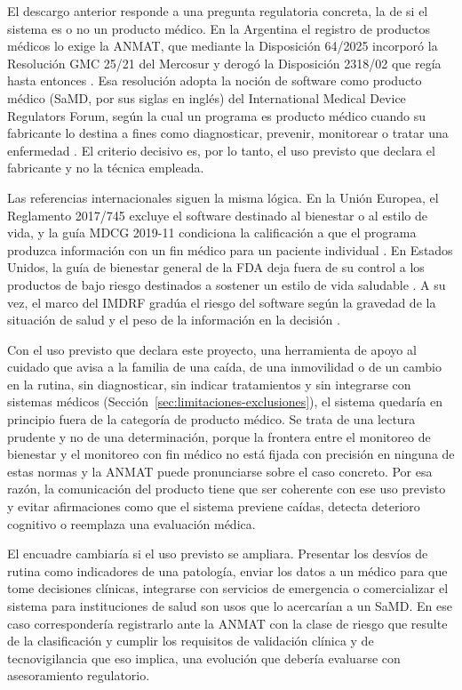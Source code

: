 El descargo anterior responde a una pregunta regulatoria concreta, la de si el sistema es o no un producto médico.
En la Argentina el registro de productos médicos lo exige la ANMAT, que mediante la Disposición 64/2025 incorporó la Resolución GMC 25/21 del Mercosur y derogó la Disposición 2318/02 que regía hasta entonces \parencite{ANMAT2025}.
Esa resolución adopta la noción de software como producto médico (SaMD, por sus siglas en inglés) del International Medical Device Regulators Forum, según la cual un programa es producto médico cuando su fabricante lo destina a fines como diagnosticar, prevenir, monitorear o tratar una enfermedad \parencite{IMDRF2013}.
El criterio decisivo es, por lo tanto, el uso previsto que declara el fabricante y no la técnica empleada.

Las referencias internacionales siguen la misma lógica.
En la Unión Europea, el Reglamento 2017/745 excluye el software destinado al bienestar o al estilo de vida, y la guía MDCG 2019-11 condiciona la calificación a que el programa produzca información con un fin médico para un paciente individual \parencite{UE2017, MDCG2019}.
En Estados Unidos, la guía de bienestar general de la FDA deja fuera de su control a los productos de bajo riesgo destinados a sostener un estilo de vida saludable \parencite{FDA2026}.
A su vez, el marco del IMDRF gradúa el riesgo del software según la gravedad de la situación de salud y el peso de la información en la decisión \parencite{IMDRF2014}.

Con el uso previsto que declara este proyecto, una herramienta de apoyo al cuidado que avisa a la familia de una caída, de una inmovilidad o de un cambio en la rutina, sin diagnosticar, sin indicar tratamientos y sin integrarse con sistemas médicos (Sección~\ref{sec:limitaciones-exclusiones}), el sistema quedaría en principio fuera de la categoría de producto médico.
Se trata de una lectura prudente y no de una determinación, porque la frontera entre el monitoreo de bienestar y el monitoreo con fin médico no está fijada con precisión en ninguna de estas normas y la ANMAT puede pronunciarse sobre el caso concreto.
Por esa razón, la comunicación del producto tiene que ser coherente con ese uso previsto y evitar afirmaciones como que el sistema previene caídas, detecta deterioro cognitivo o reemplaza una evaluación médica.

El encuadre cambiaría si el uso previsto se ampliara.
Presentar los desvíos de rutina como indicadores de una patología, enviar los datos a un médico para que tome decisiones clínicas, integrarse con servicios de emergencia o comercializar el sistema para instituciones de salud son usos que lo acercarían a un SaMD.
En ese caso correspondería registrarlo ante la ANMAT con la clase de riesgo que resulte de la clasificación y cumplir los requisitos de validación clínica y de tecnovigilancia que eso implica, una evolución que debería evaluarse con asesoramiento regulatorio.

